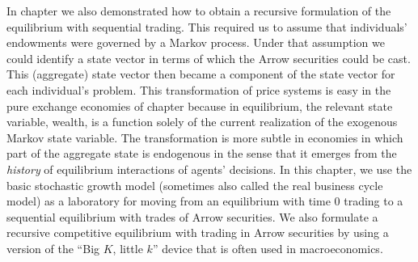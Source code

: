 In chapter  we also demonstrated how to obtain a
recursive formulation of the equilibrium with sequential trading.
This required us to assume that individuals' endowments
were governed by a Markov process. Under that assumption
we could identify a state vector
in terms of which the Arrow securities could be cast.  This
(aggregate)
state vector  then became a component of the state
vector for each individual's problem.
This transformation of price systems is easy in
    the pure exchange economies of chapter 
because in equilibrium,  the relevant state variable, wealth, is a
function solely of the
current realization of the exogenous Markov state variable.
The transformation is more subtle in economies in which
part of the aggregate state is endogenous in the sense that it
emerges from the
{\it history}
of
equilibrium interactions of agents' decisions. In
this chapter, we use the basic stochastic growth model (sometimes
also called the real business cycle model) as a laboratory for
moving from an equilibrium with time $0$ trading to a sequential
equilibrium with trades of Arrow securities. %
We also formulate  a
recursive competitive equilibrium with trading in Arrow securities
by using a version of
  the ``Big $K$, little $k$'' device that is often used
in macroeconomics.








